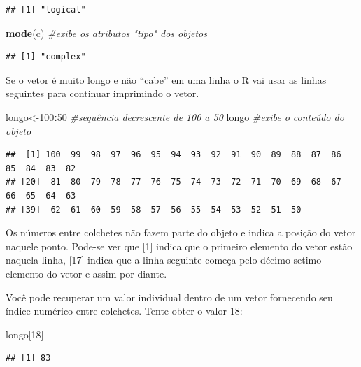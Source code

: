 \documentclass[
]{book}
\newenvironment{Shaded}{\begin{snugshade}}{\end{snugshade}}
\newcommand{\CommentTok}[1]{\textcolor[rgb]{0.56,0.35,0.01}{\textit{#1}}}
\newcommand{\DecValTok}[1]{\textcolor[rgb]{0.00,0.00,0.81}{#1}}
\newcommand{\KeywordTok}[1]{\textcolor[rgb]{0.13,0.29,0.53}{\textbf{#1}}}
\newcommand{\NormalTok}[1]{#1}
\newcommand{\OperatorTok}[1]{\textcolor[rgb]{0.81,0.36,0.00}{\textbf{#1}}}
\begin{document}
\begin{verbatim}
## [1] "logical"
\end{verbatim}

\begin{Shaded}
\begin{Highlighting}[]
\KeywordTok{mode}\NormalTok{(c) }\CommentTok{#exibe os atributos "tipo" dos objetos }
\end{Highlighting}
\end{Shaded}

\begin{verbatim}
## [1] "complex"
\end{verbatim}

Se o vetor é muito longo e não ``cabe'' em uma linha o R vai usar as linhas seguintes para continuar imprimindo o vetor.

\begin{Shaded}
\begin{Highlighting}[]
\NormalTok{longo<-}\DecValTok{100}\OperatorTok{:}\DecValTok{50} \CommentTok{#sequência decrescente de 100 a 50}
\NormalTok{longo }\CommentTok{#exibe o conteúdo do objeto }
\end{Highlighting}
\end{Shaded}

\begin{verbatim}
##  [1] 100  99  98  97  96  95  94  93  92  91  90  89  88  87  86  85  84  83  82
## [20]  81  80  79  78  77  76  75  74  73  72  71  70  69  68  67  66  65  64  63
## [39]  62  61  60  59  58  57  56  55  54  53  52  51  50
\end{verbatim}

Os números entre colchetes não fazem parte do objeto e indica a posição do vetor naquele ponto. Pode-se ver que {[}1{]} indica que o primeiro elemento do vetor estão naquela linha, {[}17{]} indica que a linha seguinte começa pelo décimo setimo elemento do vetor e
assim por diante.

Você pode recuperar um valor individual dentro de um vetor fornecendo seu índice numérico entre colchetes. Tente obter o valor 18:

\begin{Shaded}
\begin{Highlighting}[]
\NormalTok{longo[}\DecValTok{18}\NormalTok{]}
\end{Highlighting}
\end{Shaded}

\begin{verbatim}
## [1] 83
\end{verbatim}
\end{document}
